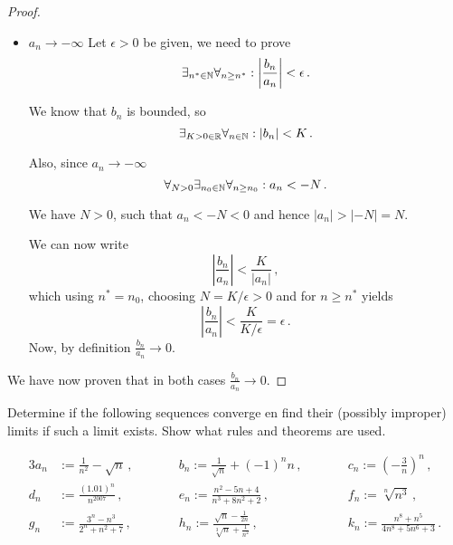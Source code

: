 \documentclass[week=3]{homework}
\begin{document}
\begin{questions}
\begin{parts}
\begin{proof}
\begin{itemize}
	    			\item $a_n \to - \infty$
	    			Let $\epsilon > 0$ be given, we need to prove
	    			\[
		    			\exists_{n^* \in \naturals} \forall_{n \ge n^*}: \left| \frac{b_n}{a_n} \right| < \epsilon\,.
	    			\]
	    			
		    		We know that $b_n$ is bounded, so
		    		\[
			    		\exists_{K > 0 \in \mathbb{R}} \forall_{n \in \mathbb{N}}: |b_n| < K\,.
		    		\]
		    		
		    		Also, since $a_n \to -\infty$
		    		\[
			    		\forall_{N > 0} \exists_{n_0 \in \mathbb{N}} \forall_{n \ge n_0}: a_n < -N\,.
		    		\]
		    		
		    		We have $N > 0$, such that $a_n < -N < 0$ and hence $|a_n| > |-N| = N$.
		    		
		    		We can now write
		    		\[
			    		\left|\frac{b_n}{a_n}\right| < \frac{K}{|a_n|}\,,
		    		\]
		    		which using $n^* = n_0$, choosing $N = K/\epsilon > 0$ and for $n \geq n^*$ yields 
		    		\[
			    		\left|\frac{b_n}{a_n}\right| < \frac{K}{K/\epsilon} = \epsilon\,.
		    		\]
		    		Now, by definition $\frac{b_n}{a_n} \to 0$.
	    		\end{itemize}
	    		
	    		We have now proven that in both cases $\frac{b_n}{a_n} \to 0$.
	    	\end{proof}
	    \end{parts}
    
	    \question
	    Determine if the following sequences converge en find their (possibly improper) limits if such a limit exists. Show what rules and theorems are used.
	    
	    \begin{alignat*}{3}
	    a_n &:= \frac{1}{n^2} - \sqrt n\,,  \qquad &&b_n := \frac{1}{\sqrt n } + (-1)^nn\,,\qquad &&c_n := \left(-\frac{3}{n}\right)^n\,, \\
	    d_n &:= \frac{(1.01)^n}{n^{2007}}\,, \qquad &&e_n := \frac{n^2-5n+4}{n^3+8n^2+2}\,, \qquad &&f_n := \sqrt[n]{n^3}\,, \\
	    g_n &:= \frac{3^n - n^3}{2^n + n^2 + 7}\,, \qquad &&h_n := \frac{\sqrt n - \frac{1}{2n}}{\sqrt[3]{n} + \frac{1}{n^2}}\,, \qquad &&k_n := \frac{n^8 + n^5}{4n^8 + 5n^6 + 3}\,.
	    \end{alignat*}
	    \begin{parts}
	    	\part
	    	

\end{parts}
\end{questions}
\end{document}
